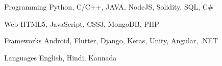 


\begin{cvskills}


\cvskill
{Programming} %
{Python, C/C++, JAVA, NodeJS, Solidity, SQL, C\#} %


\cvskill
{Web} %
{HTML5, JavaScript, CSS3, MongoDB, PHP} %


\cvskill
{Frameworks} %
{Android, Flutter, Django, Keras, Unity, Angular, .NET} %


\cvskill
{Languages} %
{English, Hindi, Kannada} %


\end{cvskills}